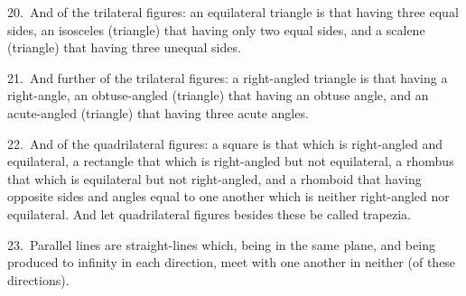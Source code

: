 \begin{Parallel}{}{}
{20.~And of the trilateral figures: an equilateral triangle is that having
three equal sides, an isosceles (triangle) that having only two equal sides,
and a scalene (triangle) that having three unequal sides.

21.~And further of the trilateral figures: a right-angled triangle is that having
a right-angle, an obtuse-angled  (triangle) that having an obtuse
angle, and an acute-angled (triangle) that having three acute angles.

22.~And of the quadrilateral figures: a square is that which is right-angled
and equilateral, a rectangle that which is right-angled but not equilateral,
a rhombus that which is equilateral but not right-angled, and a rhomboid that
having opposite sides and angles equal to one another which is neither
right-angled nor equilateral. And let quadrilateral figures besides these be called
trapezia.

23.~Parallel lines are straight-lines which, being in the same plane, and
being produced to infinity in each direction, meet with one another in
neither (of these directions).}
\end{Parallel}


\vspace{7pt}{\footnotesize 
\noindent $^\dag$ This should really be counted as a postulate, rather than as part of a definition.}

